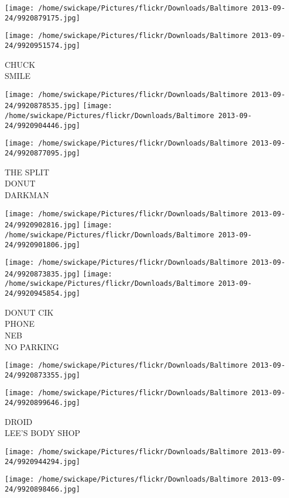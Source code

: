 \documentclass[10pt,letterpaper]{article}
\begin{document}
\texttt{[image: /home/swickape/Pictures/flickr/Downloads/Baltimore 2013-09-24/9920879175.jpg]}

\vspace{0.25in}
\texttt{[image: /home/swickape/Pictures/flickr/Downloads/Baltimore 2013-09-24/9920951574.jpg]}

CHUCK\\
SMILE
\pagebreak

\texttt{[image: /home/swickape/Pictures/flickr/Downloads/Baltimore 2013-09-24/9920878535.jpg]}
\texttt{[image: /home/swickape/Pictures/flickr/Downloads/Baltimore 2013-09-24/9920904446.jpg]}

\vspace{0.25in}
\texttt{[image: /home/swickape/Pictures/flickr/Downloads/Baltimore 2013-09-24/9920877095.jpg]}

THE SPLIT\\
DONUT\\
DARKMAN
\pagebreak

\texttt{[image: /home/swickape/Pictures/flickr/Downloads/Baltimore 2013-09-24/9920902816.jpg]}
\texttt{[image: /home/swickape/Pictures/flickr/Downloads/Baltimore 2013-09-24/9920901806.jpg]}

\texttt{[image: /home/swickape/Pictures/flickr/Downloads/Baltimore 2013-09-24/9920873835.jpg]}
\texttt{[image: /home/swickape/Pictures/flickr/Downloads/Baltimore 2013-09-24/9920945854.jpg]}

DONUT CIK\\
PHONE\\
NEB\\
NO PARKING
\pagebreak

\texttt{[image: /home/swickape/Pictures/flickr/Downloads/Baltimore 2013-09-24/9920873355.jpg]}

\vspace{0.25in}
\texttt{[image: /home/swickape/Pictures/flickr/Downloads/Baltimore 2013-09-24/9920899646.jpg]}

DROID\\
LEE'S BODY SHOP
\pagebreak

\texttt{[image: /home/swickape/Pictures/flickr/Downloads/Baltimore 2013-09-24/9920944294.jpg]}

\vspace{0.25in}
\texttt{[image: /home/swickape/Pictures/flickr/Downloads/Baltimore 2013-09-24/9920898466.jpg]}
\end{document}
